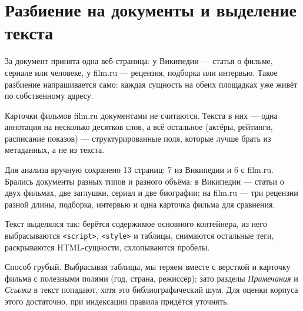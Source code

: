 \section{Разбиение на документы и выделение текста}

За документ принята одна веб-страница: у Википедии --- статья о фильме, сериале или
человеке, у film.ru --- рецензия, подборка или интервью. Такое разбиение напрашивается
само: каждая сущность на обеих площадках уже живёт по собственному адресу.

Карточки фильмов film.ru документами не считаются. Текста в них --- одна аннотация на
несколько десятков слов, а всё остальное (актёры, рейтинги, расписание показов) ---
структурированные поля, которые лучше брать из метаданных, а не из текста.

Для анализа вручную сохранено 13 страниц: 7 из Википедии и 6 с film.ru. Брались
документы разных типов и разного объёма: в Википедии --- статьи о двух фильмах, две
заглушки, сериал и две биографии; на film.ru --- три рецензии разной длины, подборка,
интервью и одна карточка фильма для сравнения.

Текст выделялся так: берётся содержимое основного контейнера, из него выбрасываются
\texttt{<script>}, \texttt{<style>} и таблицы, снимаются остальные теги, раскрываются
HTML-сущности, схлопываются пробелы.

Способ грубый. Выбрасывая таблицы, мы теряем вместе с версткой и карточку фильма с
полезными полями (год, страна, режиссёр); зато разделы \emph{Примечания} и
\emph{Ссылки} в текст попадают, хотя это библиографический шум. Для оценки корпуса
этого достаточно, при индексации правила придётся уточнять.

\pagebreak
